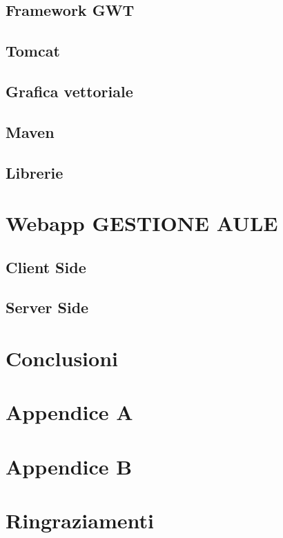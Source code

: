 \documentclass[a4paper,pt11,oneside]{book}
\begin{document}
\section{Framework GWT}


\section{Tomcat}


\section{Grafica vettoriale}


\section{Maven}


\section{Librerie}

\newpage

\chapter{Webapp GESTIONE AULE}


\section{Client Side}



\FloatBarrier





\section{Server Side}


\newpage

\chapter{Conclusioni}

\newpage

\chapter{Appendice A}

\newpage

\chapter{Appendice B}


\newpage

\chapter*{Ringraziamenti}
\end{document}
